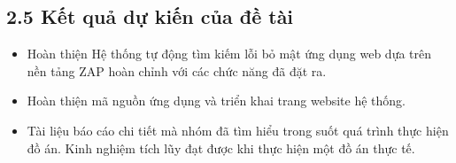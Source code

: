 \subsection*{2.5  Kết quả dự kiến của đề tài}
\begin{itemize}
    \item Hoàn thiện Hệ thống tự động tìm kiếm lỗi bỏ mật ứng dụng web dựa trên nền tảng ZAP hoàn chỉnh với các chức năng đã đặt ra.
    \item Hoàn thiện mã nguồn ứng dụng và triển khai trang website hệ thống.
    \item Tài liệu báo cáo chi tiết mà nhóm đã tìm hiểu trong suốt quá trình thực hiện đồ án. Kinh nghiệm tích lũy đạt được khi thực hiện một đồ án thực tế.
\end{itemize}